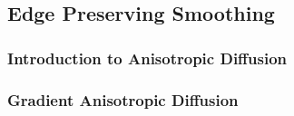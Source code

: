 








\subsection{Edge Preserving Smoothing}
\label{sec:EdgePreservingSmoothingFilters}

\subsubsection{Introduction to Anisotropic Diffusion}
\label{sec:IntroductionAnisotropicDiffusion}
\ifitkFullVersion

\fi


\subsubsection{Gradient Anisotropic Diffusion}
\label{sec:GradientAnisotropicDiffusionImageFilter}


